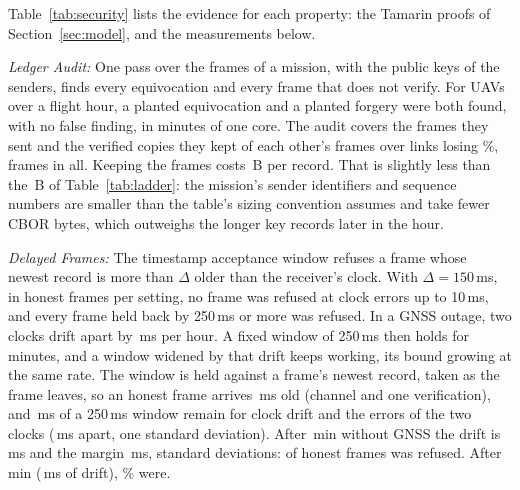 \documentclass[lineno,pdflatex,sn-mathphys-num]{sn-jnl}
\newcommand{\runin}[1]{\textit{#1:}}
\renewcommand{\_}{\authbcunderscore\allowbreak}
\begin{document}
Table~\ref{tab:security} lists the evidence for each property: the Tamarin proofs of
Section~\ref{sec:model}, and the measurements below.

\runin{Ledger Audit} One pass over the frames of a mission, with the public keys of the senders,
finds every equivocation and every frame that does not verify. For \auUavs{} UAVs over a flight
hour, a planted equivocation and a planted forgery were both found, with no false finding, in
\auMinutes{} minutes of one core.
The audit covers the \auSent{} frames they sent and the \auHeld{} verified copies they
kept of each other's frames over links losing \auLossPct\%, \auFrames{} frames in all.
Keeping the frames costs \auKept\,B per record.
That is slightly less than the \bprLeanDesign\,B of Table~\ref{tab:ladder}: the
mission's sender identifiers and sequence numbers are smaller than the table's sizing convention
assumes and take fewer CBOR bytes, which outweighs the longer key records later in the hour.

\runin{Delayed Frames}\label{sec:delay} The timestamp acceptance window refuses a frame whose
newest record is more than $\Delta$ older than the receiver's clock. With $\Delta = 150$\,ms, in
\rpFrames{} honest frames per setting, no frame was refused at clock errors up to 10\,ms, and every
frame held back by 250\,ms or more was refused. In a GNSS outage, two clocks drift apart by
\rpDrift\,ms per hour. A fixed window of 250\,ms then holds for \rpHolds{} minutes, and a window
widened by that drift keeps working, its bound growing at the same rate.
The window is held against a frame's newest record, taken as the frame leaves, so an
honest frame arrives \rpAfterMs\,ms old (channel and one verification), and \rpBudgetMs\,ms of a
250\,ms window remain for clock drift and the errors of the two clocks (\rpApartMs\,ms apart, one
standard deviation). After \rpHolds\,min without GNSS the drift is \rpDriftHold\,ms and the
margin \rpMarginMs\,ms, \rpMarginSd{} standard deviations: \rpHoldRefused{} of \rpFrames{} honest
frames was refused. After \rpNextMin\,min (\rpNextDrift\,ms of drift), \rpNextPct\% were.
\end{document}
